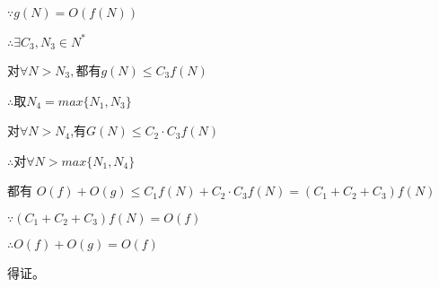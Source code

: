 \documentclass[UTF8]{ctexart}
\begin{document}
\qquad $\because g(N) = O(f(N))$

\qquad $\therefore \exists C_3, N_3 \in N^*$

\qquad \quad 对$\forall N > N_3,$都有$g(N) \le C_3f(N)$

\qquad $\therefore$取$N_4 = max\{N_1, N_3\}$

\qquad \quad 对$\forall N > N_4$,有$G(N) \le C_2 \cdot C_3f(N)$

\qquad $\therefore$对$\forall N > max\{N_1, N_4\}$ 

\qquad \quad 都有 $O(f) + O(g) \le C_1f(N) + C_2 \cdot C_3f(N) = (C_1 + C_2 + C_3)f(N)$

\qquad $\because (C_1 + C_2 + C_3)f(N) = O(f)$

\qquad $\therefore O(f) + O(g) = O(f)$

\qquad 得证。
\end{document}
